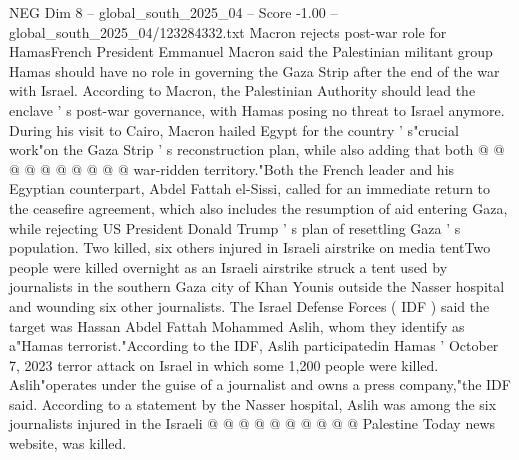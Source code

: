 \begin{textsample}{NEG Dim 8 – global\_south\_2025\_04 – Score -1.00 – global\_south\_2025\_04/123284332.txt}
Macron rejects post-war role for HamasFrench President Emmanuel Macron said the Palestinian militant group Hamas should have no role in governing the Gaza Strip after the end of the war with Israel.
According to Macron, the Palestinian Authority should lead the enclave ' s post-war governance, with Hamas posing no threat to Israel anymore.
During his visit to Cairo, Macron hailed Egypt for the country ' s"crucial work"on the Gaza Strip ' s reconstruction plan, while also adding that both @ @ @ @ @ @ @ @ @ @ war-ridden territory."Both the French leader and his Egyptian counterpart, Abdel Fattah el-Sissi, called for an immediate return to the ceasefire agreement, which also includes the resumption of aid entering Gaza, while rejecting US President Donald Trump ' s plan of resettling Gaza ' s population.
Two killed, six others injured in Israeli airstrike on media tentTwo people were killed overnight as an Israeli airstrike struck a tent used by journalists in the southern Gaza city of Khan Younis outside the Nasser hospital and wounding six other journalists.
The Israel Defense Forces ( IDF ) said the target was Hassan Abdel Fattah Mohammed Aslih, whom they identify as a"Hamas terrorist."According to the IDF, Aslih participatedin Hamas ' October 7, 2023 terror attack on Israel in which some 1,200 people were killed.
Aslih"operates under the guise of a journalist and owns a press company,"the IDF said.
According to a statement by the Nasser hospital, Aslih was among the six journalists injured in the Israeli @ @ @ @ @ @ @ @ @ @ Palestine Today news website, was killed.

\end{textsample}
